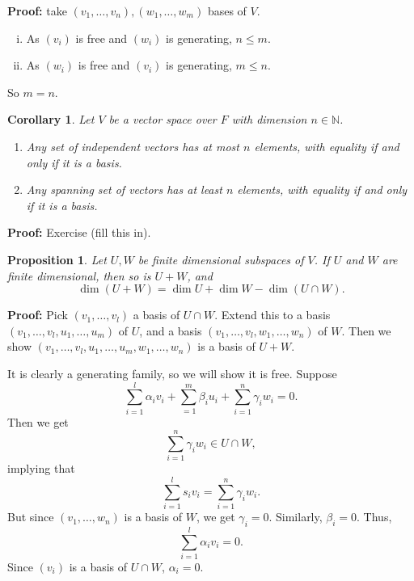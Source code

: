 \documentclass[12pt]{article}
\newtheorem{corollary}{Corollary}[section]
\newtheorem{proposition}{Proposition}[section]
\theoremstyle{definition}
\theoremstyle{remark}
\begin{document}
\begin{adjustbox}{minipage = \columnwidth - 25.5pt, margin=1em, frame=1pt, margin=0em}
	\textbf{Proof:} take $(v_1, \ldots, v_n), (w_1, \ldots, w_m)$ bases of $V$.
	\begin{enumerate}[(i)]
		\item As $(v_i)$ is free and $(w_i)$ is generating, $n \leq m$.
		\item As $(w_i)$ is free and $(v_i)$ is generating, $m \leq n.$
	\end{enumerate}
	So $m = n$.
\end{adjustbox}

\begin{corollary}
	Let $V$ be a vector space over $F$ with dimension $n \in \mathbb{N}$.
	\begin{enumerate}[\normalfont(i)]
		\item Any set of independent vectors has at most $n$ elements, with equality if and only if it is a basis.
		\item Any spanning set of vectors has at least $n$ elements, with equality if and only if it is a basis.
	\end{enumerate}
	
\end{corollary}

\begin{adjustbox}{minipage = \columnwidth - 25.5pt, margin=1em, frame=1pt, margin=0em}
	\textbf{Proof:} Exercise (fill this in).
\end{adjustbox}

\begin{proposition}
	Let $U, W$ be finite dimensional subspaces of $V$. If $U$ and $W$ are finite dimensional, then so is $U + W$, and
	\[
		\dim (U + W) = \dim U + \dim W - \dim(U \cap W)
	.\]
\end{proposition}

\begin{adjustbox}{minipage = \columnwidth - 25.5pt, margin=1em, frame=1pt, margin=0em}
	\textbf{Proof:} Pick $(v_1, \ldots, v_l)$ a basis of $U \cap W$. Extend this to a basis $(v_1, \ldots, v_l, u_1, \ldots, u_m)$ of $U$, and a basis $(v_1, \ldots, v_l, w_1, \ldots, w_n)$ of $W$. Then we show $(v_1, \ldots, v_l, u_1, \ldots, u_m, w_1, \ldots, w_n)$ is a basis of $U + W$.

	It is clearly a generating family, so we will show it is free. Suppose
	\[
		\sum_{i = 1}^{l} \alpha_i v_i + \sum_{ = 1}^{m} \beta_i u_i + \sum_{i = 1}^{n} \gamma_i w_i = 0
	.\]
	Then we get
	\[
	\sum_{i = 1}^{n} \gamma_i w_i \in U \cap W
	,\]
	implying that
	\[
	\sum_{i = 1}^{l} s_i v_i = \sum_{i = 1}^{n} \gamma_i w_i
	.\]
	But since $(v_1, \ldots, w_n)$ is a basis of $W$, we get $\gamma_i = 0$. Similarly, $\beta_i = 0$. Thus,
	\[
	\sum_{i = 1}^{l} \alpha_i v_i = 0
	.\]
	Since $(v_i)$ is a basis of $U \cap W$, $\alpha_i = 0$.
\end{adjustbox}
\end{document}
